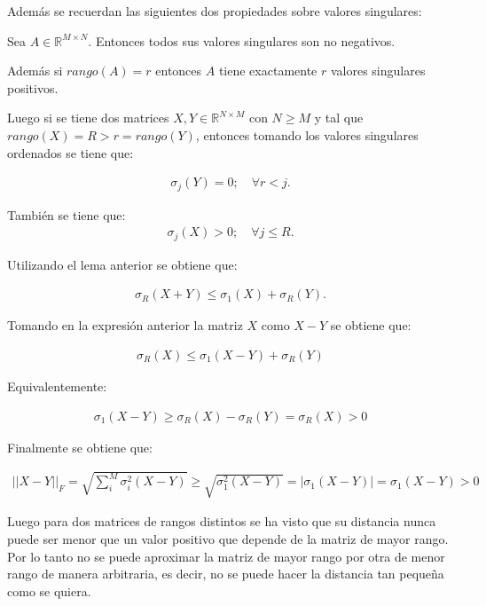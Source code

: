 Además se recuerdan las siguientes dos propiedades sobre valores singulares:
\begin{prop}
Sea $A\in\mathbb{R}^{M\times N}$. Entonces todos sus valores singulares son no negativos. 

Además si $rango(A)=r$ entonces $A$ tiene exactamente $r$ valores singulares positivos.
\end{prop}

Luego si se tiene dos matrices $X,Y\in\mathbb{R}^{N\times M}$ con $N \geq M$ y tal que $rango(X) = R > r = rango(Y)$, entonces tomando los valores singulares ordenados se tiene que: 

\begin{align*}
\sigma_j(Y) = 0; \quad \forall r < j.
\end{align*}

También se tiene que:
\begin{align*}
\sigma_j(X) > 0; \quad \forall j \leq R.
\end{align*}

Utilizando el lema anterior se obtiene que:

\begin{align*}
\sigma_{R}(X+Y) \leq \sigma_1(X) + \sigma_R(Y).
\end{align*}

Tomando en la expresión anterior la matriz $X$ como $X-Y$ se obtiene que:

\begin{align*}
\sigma_{R}(X) \leq \sigma_1(X-Y) + \sigma_R(Y)
\end{align*}

Equivalentemente:

\begin{align*}
\sigma_1(X-Y) \geq  \sigma_{R}(X) - \sigma_R(Y) = \sigma_R(X) > 0
\end{align*}

Finalmente se obtiene que:

\begin{align*}
||X-Y||_F = \sqrt{\sum_i^M \sigma_i^2(X-Y)} \geq \sqrt{\sigma_1^2(X-Y)} = |\sigma_1(X-Y)| = \sigma_1(X-Y) > 0
\end{align*}

Luego para dos matrices de rangos distintos se ha visto que su distancia nunca puede ser menor que un valor positivo que depende de la matriz de mayor rango. Por lo tanto no se puede aproximar la matriz de mayor rango por otra de menor rango de manera arbitraria, es decir, no se puede hacer la distancia tan pequeña como se quiera. 

